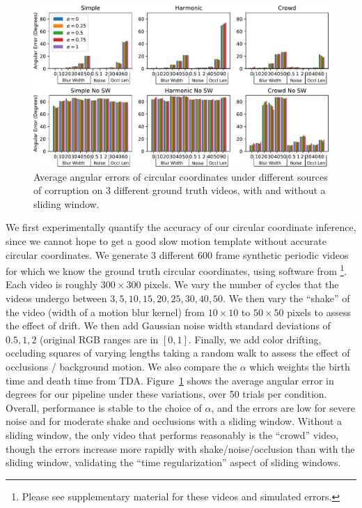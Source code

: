 \documentclass{article}
\begin{document}
\begin{figure}
\centering
\includegraphics[width=\columnwidth]{RobustnessTests.pdf}
\caption{Average angular errors of circular coordinates under different sources of corruption on 3 different ground truth videos, with and without a sliding window.}
\label{fig:RobustnessTests}
\end{figure}



We first experimentally quantify the accuracy of our circular coordinate inference, since we cannot hope to get a good slow motion template without accurate circular coordinates.  We generate 3 different 600 frame synthetic periodic videos for which we know the ground truth circular coordinates, using software from \cite{jacobson2012fast}\footnote{Please see supplementary material for these videos and simulated errors.}.  Each video is roughly $300 \times 300$ pixels.  We vary the number of cycles that the videos undergo between $3, 5, 10, 15, 20, 25, 30, 40, 50$.  We then vary the ``shake'' of the video (width of a motion blur kernel) from $10 \times 10 $ to $50 \times 50$ pixels to assess the effect of drift.  We then add Gaussian noise width standard deviations of $0.5, 1, 2$ (original RGB ranges are in $[0, 1]$.  Finally, we add color drifting, occluding squares of varying lengths taking a random walk to assess the effect of occlusions / background motion.  We also compare the $\alpha$ which weights the birth time and death time from TDA.  Figure~\ref{fig:RobustnessTests} shows the average angular error in degrees for our pipeline under these variations, over 50 trials per condition.  Overall, performance is stable to the choice of $\alpha$, and the errors are low for severe noise and for moderate shake and occlusions with a sliding window.  Without a sliding window, the only video that performs reasonably is the ``crowd'' video, though the errors increase more rapidly with shake/noise/occlusion than with the sliding window, validating the ``time regularization'' aspect of sliding windows.  
\end{document}
